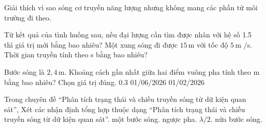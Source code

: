 \begin{ex}
Giải thích vì sao sóng cơ truyền năng lượng nhưng không mang các phần tử môi trường đi theo.
\choiceTF

\end{ex}

\begin{ex}
Từ kết quả của tình huống sau, nếu đại lượng cần tìm được nhân với hệ số 1.5 thì giá trị mới bằng bao nhiêu? Một xung sóng đi được $15\,\text{m}$ với tốc độ $5\,\text{m}$ /s. Thời gian truyền tính theo s bằng bao nhiêu?
\end{ex}

\begin{ex}
Bước sóng là $2,4\,\text{m}$. Khoảng cách gần nhất giữa hai điểm vuông pha tính theo m bằng bao nhiêu? Chọn giá trị đúng.
\choice
{0.3}
{01/06/2026}
{}
{01/02/2026}
\end{ex}

\begin{ex}
Trong chuyên đề “Phân tích trạng thái và chiều truyền sóng từ dữ kiện quan sát”, Xét các nhận định tổng hợp thuộc dạng “Phân tích trạng thái và chiều truyền sóng từ dữ kiện quan sát”.
\choiceTF
{\True một bước sóng.}
{\True ngược pha.}
{\True $\lambda/2$.}
{nửa bước sóng.}
\end{ex}

